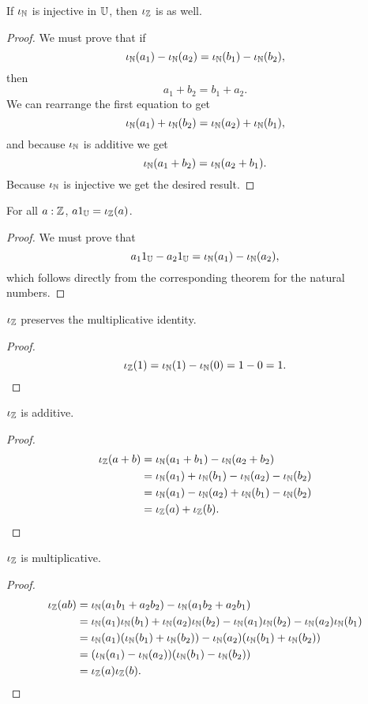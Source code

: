 \documentclass[../../math.tex]{subfiles}
\begin{document}
\begin{instance}
    If $\iota_{\mathbb{N}}$ is injective in $\mathbb{U}$, then $\iota_{\mathbb{Z}}$ is as well.
\end{instance}
\begin{proof}
    We must prove that if
    \[
        \iota_{\mathbb{N}}(a_1) - \iota_{\mathbb{N}}(a_2) = \iota_{\mathbb{N}}(b_1) - \iota_{\mathbb{N}}(b_2),
    \]
    then
    \[
        a_1 + b_2 = b_1 + a_2.
    \]
    We can rearrange the first equation to get
    \[
        \iota_{\mathbb{N}}(a_1) + \iota_{\mathbb{N}}(b_2) = \iota_{\mathbb{N}}(a_2) + \iota_{\mathbb{N}}(b_1),
    \]
    and because $\iota_{\mathbb{N}}$ is additive we get
    \[
        \iota_{\mathbb{N}}(a_1 + b_2) = \iota_{\mathbb{N}}(a_2 + b_1).
    \]
    Because $\iota_{\mathbb{N}}$ is injective we get the desired result.
\end{proof}

\begin{theorem}
    For all $a : \mathbb{Z}$, $a1_{\mathbb{U}} = \iota_{\mathbb{Z}}(a)$.
\end{theorem}
\begin{proof}
    We must prove that
    \[
        a_1 1_{\mathbb{U}} - a_2 1_{\mathbb{U}} = \iota_{\mathbb{N}}(a_1) - \iota_{\mathbb{N}}(a_2),
    \]
    which follows directly from the corresponding theorem for the natural
    numbers.
\end{proof}

\begin{instance} \label{from_int_one}
    $\iota_{\mathbb{Z}}$ preserves the multiplicative identity.
\end{instance}
\begin{proof}
    \[
        \iota_{\mathbb{Z}}(1) = \iota_{\mathbb{N}}(1) - \iota_{\mathbb{N}}(0) = 1 - 0 = 1.
    \]
\end{proof}

\begin{instance} \label{from_int_plus}
    $\iota_{\mathbb{Z}}$ is additive.
\end{instance}
\begin{proof}
    \begin{align*}
        \iota_{\mathbb{Z}}(a + b) &= \iota_{\mathbb{N}}(a_1 + b_1) - \iota_{\mathbb{N}}(a_2 + b_2) \\ &=
        \iota_{\mathbb{N}}(a_1) + \iota_{\mathbb{N}}(b_1) - \iota_{\mathbb{N}}(a_2) - \iota_{\mathbb{N}}(b_2) \\ &=
        \iota_{\mathbb{N}}(a_1) - \iota_{\mathbb{N}}(a_2) + \iota_{\mathbb{N}}(b_1) - \iota_{\mathbb{N}}(b_2) \\ &=
        \iota_{\mathbb{Z}}(a) + \iota_{\mathbb{Z}}(b).
    \end{align*}
\end{proof}

\begin{instance} \label{from_int_mult}
    $\iota_{\mathbb{Z}}$ is multiplicative.
\end{instance}
\begin{proof}
    \begin{align*}
        \iota_{\mathbb{Z}}(ab)
        &= \iota_{\mathbb{N}}(a_1b_1 + a_2b_2) - \iota_{\mathbb{N}}(a_1b_2 + a_2b_1) \\
        &= \iota_{\mathbb{N}}(a_1)\iota_{\mathbb{N}}(b_1) + \iota_{\mathbb{N}}(a_2)\iota_{\mathbb{N}}(b_2)
            - \iota_{\mathbb{N}}(a_1)\iota_{\mathbb{N}}(b_2) - \iota_{\mathbb{N}}(a_2)\iota_{\mathbb{N}}(b_1) \\
        &= \iota_{\mathbb{N}}(a_1)(\iota_{\mathbb{N}}(b_1) + \iota_{\mathbb{N}}(b_2)) - \iota_{\mathbb{N}}(a_2)(\iota_{\mathbb{N}}(b_1) + \iota_{\mathbb{N}}(b_2)) \\
        &= (\iota_{\mathbb{N}}(a_1) - \iota_{\mathbb{N}}(a_2)) (\iota_{\mathbb{N}}(b_1) - \iota_{\mathbb{N}}(b_2)) \\
        &= \iota_{\mathbb{Z}}(a) \iota_{\mathbb{Z}}(b).
    \end{align*}
\end{proof}
\end{document}
